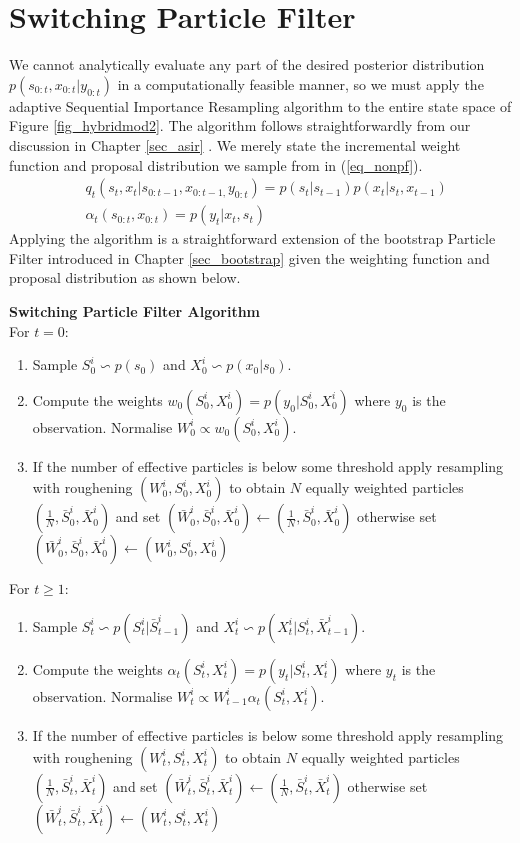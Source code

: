 \section{Switching Particle Filter}
We cannot analytically evaluate any part of the desired posterior distribution $p(s_{0:t}, x_{0:t}|y_{0:t})$ in a computationally feasible manner, so we must apply the adaptive Sequential Importance Resampling algorithm to the entire state space of Figure \ref{fig_hybridmod2}. The algorithm follows straightforwardly from our discussion in Chapter \ref{sec_asir} \cite{murphy1}. We merely state the incremental weight function and proposal distribution we sample from in (\ref{eq_nonpf}). 
\begin{equation}
\begin{aligned}
&q_t(s_t,x_t|s_{0:t-1},x_{0:t-1,}y_{0:t}) = p(s_t|s_{t-1})p(x_t|s_t,x_{t-1}) \\
&\alpha_t(s_{0:t},x_{0:t}) = p(y_t|x_t,s_t)
\end{aligned}
\label{eq_nonpf}
\end{equation}  
Applying the algorithm is a straightforward extension of the bootstrap Particle Filter introduced in Chapter \ref{sec_bootstrap} given the weighting function and proposal distribution as shown below.

\textbf{Switching Particle Filter Algorithm}\\
For $t=0$:
\begin{enumerate}
\item
Sample $S^i_0 \backsim p(s_0)$ and $X^i_0 \backsim p(x_0|s_0)$.
\item
Compute the weights $w_0(S_0^i, X_0^i) = p(y_0|S_0^i, X_0^i)$ where $y_0$ is the observation. Normalise $W^i_0 \propto w_0(S_0^i, X_0^i)$. 
\item
If the number of effective particles is below some threshold apply resampling with roughening $(W^i_0, S^i_0, X^i_0)$ to obtain $N$ equally weighted particles $(\frac{1}{N}, \bar{S}^i_0, \bar{X}^i_0)$ and set $(\bar{W}^i_0, \bar{S}^i_0,\bar{X}^i_0) \leftarrow (\frac{1}{N}, \bar{S}^i_0, \bar{X}^i_0)$ otherwise set $(\bar{W}^i_0,\bar{S}^i_0, \bar{X}^i_0) \leftarrow ({W}^i_0, S_0^i, {X}^i_0)$
\end{enumerate}
For $t \geq 1$:
\begin{enumerate}
\item
Sample $S^i_t \backsim p(S_t^i|\bar{S}^i_{t-1})$ and $X^i_t \backsim p(X^i_t|S^i_t, \bar{X}^i_{t-1})$.
\item
Compute the weights $\alpha_t(S_t^i, X_t^i) = p(y_t|S_t^i, X_t^i)$ where $y_t$ is the observation. Normalise $W^i_t \propto W^i_{t-1}\alpha_t(S_t^i, X_t^i)$.
\item
If the number of effective particles is below some threshold apply resampling with roughening $(W^i_t, S^i_t, X^i_t)$ to obtain $N$ equally weighted particles $(\frac{1}{N}, \bar{S}^i_t, \bar{X}^i_t)$ and set $(\bar{W}^i_t, \bar{S}^i_t,\bar{X}^i_t) \leftarrow (\frac{1}{N}, \bar{S}^i_t, \bar{X}^i_t)$ otherwise set $(\bar{W}^i_t,\bar{S}^i_t, \bar{X}^i_t) \leftarrow ({W}^i_t, S_t^i, {X}^i_t)$
\end{enumerate} 

